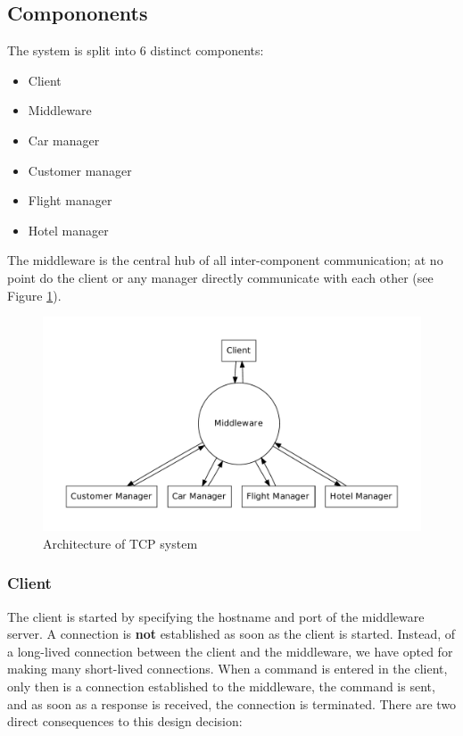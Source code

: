 \documentclass[11pt]{article}
\begin{document}
\subsection{Compononents}

The system is split into 6 distinct components:

\begin{itemize}
\item Client
\item Middleware
\item Car manager
\item Customer manager
\item Flight manager
\item Hotel manager
\end{itemize}

The middleware is the central hub of all inter-component
communication; at no point do the client or any manager directly
communicate with each other (see Figure \ref{fig:tcp}).


\begin{figure}[h]
  \begin{center}
    \caption{Architecture of TCP system \label{fig:tcp} }
    \includegraphics[scale=0.4]{tcp-diagram.pdf}
  \end{center}
\end{figure}

\subsubsection{Client}

The client is started by specifying the hostname and port of the
middleware server.  A connection is {\bf not} established as soon as
the client is started.  Instead, of a long-lived connection between
the client and the middleware, we have opted for making many
short-lived connections.  When a command is entered in the client,
only then is a connection established to the middleware, the command
is sent, and as soon as a response is received, the connection is
terminated.  There are two direct consequences to this design
decision:
\end{document}
